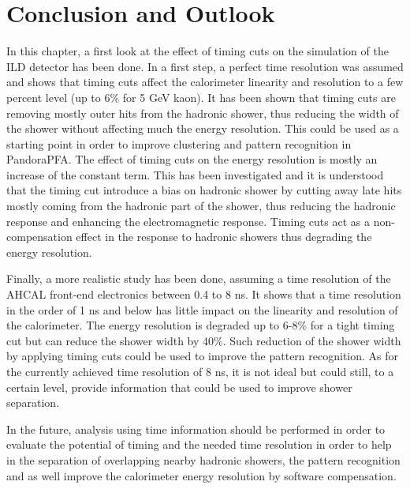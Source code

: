 \section{Conclusion and Outlook}

In this chapter, a first look at the effect of timing cuts on the \geant simulation of the ILD detector has been done. In a first step, a perfect time resolution was assumed and shows that timing cuts affect the calorimeter linearity and resolution to a few percent level (up to 6\% for 5 GeV kaon). It has been shown that timing cuts are removing mostly outer hits from the hadronic shower, thus reducing the width of the shower without affecting much the energy resolution. This could be used as a starting point in order to improve clustering and pattern recognition in PandoraPFA. The effect of timing cuts on the energy resolution is mostly an increase of the constant term. This has been investigated and it is understood that the timing cut introduce a bias on hadronic shower by cutting away late hits mostly coming from the hadronic part of the shower, thus reducing the hadronic response and enhancing the electromagnetic response. Timing cuts act as a non-compensation effect in the response to hadronic showers thus degrading the energy resolution.

Finally, a more realistic study has been done, assuming a time resolution of the AHCAL front-end electronics between 0.4 to 8 ns. It shows that a time resolution in the order of 1 ns and below has little impact on the linearity and resolution of the calorimeter. The energy resolution is degraded up to 6-8\% for a tight timing cut but can reduce the shower width by 40\%. Such reduction of the shower width by applying timing cuts could be used to improve the pattern recognition. As for the currently achieved time resolution of 8 ns, it is not ideal but could still, to a certain level, provide information that could be used to improve shower separation.

In the future, analysis using time information should be performed in order to evaluate the potential of timing and the needed time resolution in order to help in the separation of overlapping nearby hadronic showers, the pattern recognition and as well improve the calorimeter energy resolution by software compensation.
